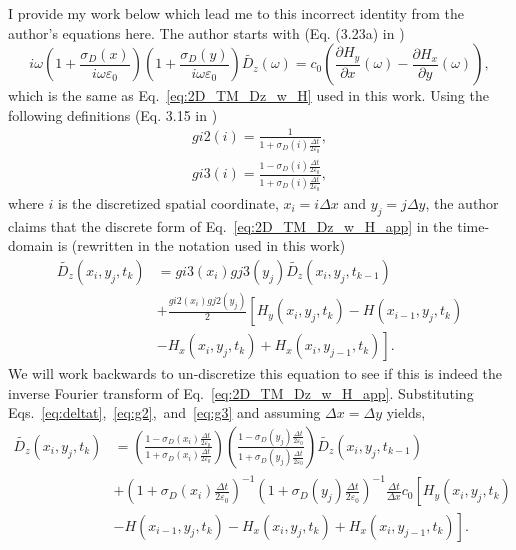 \documentclass[12pt,twocolumn]{article}
\begin{document}
I provide my work below which lead me to this incorrect identity from the author's equations here. The author starts with (Eq. (3.23a) in \cite{Sullivan00})
\begin{equation}
\label{eq:2D_TM_Dz_w_H_app}i\omega\left(1+\frac{\sigma_D(x)}{i\omega\varepsilon_0}\right)\left(1+\frac{\sigma_D(y)}{i\omega\varepsilon_0}\right)\tilde{D_z}(\omega) = c_0\left(\frac{\partial H_y}{\partial x}(\omega)-\frac{\partial H_x}{\partial y}(\omega)\right),
\end{equation}
which is the same as Eq.~\ref{eq:2D_TM_Dz_w_H} used in this work. Using the following definitions (Eq. 3.15  in \cite{Sullivan00})
\begin{subequations}
\begin{align}
\label{eq:g2}gi2(i) = \frac{1}{1+\sigma_D(i)\frac{\Delta t}{2\varepsilon_0}},\\
\label{eq:g3}gi3(i) = \frac{1-\sigma_D(i)\frac{\Delta t}{2\varepsilon_0}}{1+\sigma_D(i)\frac{\Delta t}{2\varepsilon_0}},
\end{align}
\end{subequations}
where $i$ is the discretized spatial coordinate, $x_i = i\Delta x$ and $y_j = j\Delta y$, the author claims that the discrete form of Eq.~\ref{eq:2D_TM_Dz_w_H_app} in the time-domain is (rewritten in the notation used in this work)
\begin{equation}
\label{eq:Sullivan_Dz}
\begin{split}
\tilde{D_z}(x_i,y_j,t_k) &= gi3(x_i)gj3(y_j)\tilde{D_z}(x_i,y_j,t_{k-1})\\
 &+ \frac{gi2(x_i)gj2(y_j)}{2}\left[H_y(x_i,y_j,t_k)-H(x_{i-1},y_j,t_k)\right.\\
&\left.-H_x(x_i,y_j,t_k)+H_x(x_i,y_{j-1},t_k)\right].
\end{split}
\end{equation}
We will work backwards to un-discretize this equation to see if this is indeed the inverse Fourier transform of Eq.~\ref{eq:2D_TM_Dz_w_H_app}. Substituting Eqs.~\ref{eq:deltat},~\ref{eq:g2},~and~\ref{eq:g3} and assuming $\Delta x = \Delta y$ yields,
\begin{equation}
\begin{split}
\tilde{D_z}(x_i,y_j,t_k) &= \left(\frac{1-\sigma_D(x_i)\frac{\Delta t}{2\varepsilon_0}}{1+\sigma_D(x_i)\frac{\Delta t}{2\varepsilon_0}}\right)\left(\frac{1-\sigma_D(y_j)\frac{\Delta t}{2\varepsilon_0}}{1+\sigma_D(y_j)\frac{\Delta t}{2\varepsilon_0}}\right)\tilde{D_z}(x_i,y_j,t_{k-1})\\
 &+ \left(1+\sigma_D(x_i)\frac{\Delta t}{2\varepsilon_0}\right)^{-1}\left(1+\sigma_D(y_j)\frac{\Delta t}{2\varepsilon_0}\right)^{-1}\frac{\Delta t}{\Delta x}c_0\left[H_y(x_i,y_j,t_k)\right. \\
&\left.-H(x_{i-1},y_j,t_k)-H_x(x_i,y_j,t_k)+H_x(x_i,y_{j-1},t_k)\right].
\end{split}
\end{equation}
\end{document}
